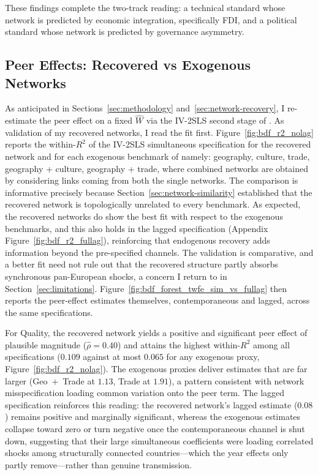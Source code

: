 \documentclass[12pt,a4paper]{article}
\begin{document}
These findings complete the two-track reading: a technical standard whose network is predicted by economic integration, specifically FDI, and a political standard whose network is predicted by governance asymmetry.



\clearpage

\subsection{Peer Effects: Recovered vs Exogenous Networks}
\label{sec:peer-effects}

As anticipated in Sections~\ref{sec:methodology} and~\ref{sec:network-recovery}, I re-estimate the peer effect on a fixed $\hat W$ via the IV-2SLS second stage of \citet{bramoulle2009}. As validation of my recovered networks, I read the fit first. Figure~\ref{fig:bdf_r2_nolag} reports the within-$R^2$ of the IV-2SLS simultaneous specification for the recovered network and for each exogenous benchmark of \citet{albuquerque2007} namely: geography, culture, trade, geography + culture, geography + trade, where combined networks are obtained by considering links coming from both the single networks. The comparison is informative precisely because Section~\ref{sec:network-similarity} established that the recovered network is topologically unrelated to every benchmark. As expected, the recovered networks do show the best fit with respect to the exogenous benchmarks, and this also holds in the lagged specification (Appendix Figure~\ref{fig:bdf_r2_fullag}), reinforcing that endogenous recovery adds information beyond the pre-specified channels. The validation is comparative, and a better fit need not rule out that the recovered structure partly absorbs synchronous pan-European shocks, a concern I return to in Section~\ref{sec:limitations}. Figure~\ref{fig:bdf_forest_twfe_sim_vs_fullag} then reports the peer-effect estimates themselves, contemporaneous and lagged, across the same specifications.

For Quality, the recovered network yields a positive and significant peer effect of plausible magnitude ($\hat\rho = 0.40$) and attains the highest within-$R^2$ among all specifications ($0.109$ against at most $0.065$ for any exogenous proxy, Figure~\ref{fig:bdf_r2_nolag}). The exogenous proxies deliver estimates that are far larger (Geo~$+$~Trade at $1.13$, Trade at $1.91$), a pattern consistent with network misspecification loading common variation onto the peer term. The lagged specification reinforces this reading: the recovered network's lagged estimate ($0.08$) remains positive and marginally significant, whereas the exogenous estimates collapse toward zero or turn negative once the contemporaneous channel is shut down, suggesting that their large simultaneous coefficients were loading correlated shocks among structurally connected countries---which the year effects only partly remove---rather than genuine transmission.
\end{document}
